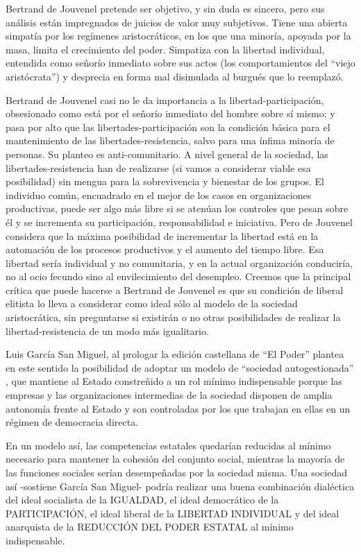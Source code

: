 \documentclass[
]{book}
\begin{document}
Bertrand de Jouvenel pretende ser objetivo, y sin duda es sincero, pero sus análisis están impregnados de juicios de valor muy subjetivos. Tiene una abierta simpatía por los regímenes aristocráticos, en los que una minoría, apoyada por la masa, limita el crecimiento del poder. Simpatiza con la libertad individual, entendida como señorío inmediato sobre sus actos (los comportamientos del ``viejo aristócrata'') y desprecia en forma mal disimulada al burgués que lo reemplazó.

Bertrand de Jouvenel casi no le da importancia a la libertad-participación, obsesionado como está por el señorío inmediato del hombre sobre sí mismo; y pasa por alto que las libertades-participación son la condición básica para el mantenimiento de las libertades-resistencia, salvo para una ínfima minoría de personas. Su planteo es anti-comunitario. A nivel general de la sociedad, las libertades-resistencia han de realizarse (si vamos a considerar viable esa posibilidad) sin mengua para la sobrevivencia y bienestar de los grupos. El individuo común, encuadrado en el mejor de los casos en organizaciones productivas, puede ser algo más libre si se atenúan los controles que pesan sobre él y se incrementa su participación, responsabilidad e iniciativa. Pero de Jouvenel considera que la máxima posibilidad de incrementar la libertad está en la automación de los procesos productivos y el aumento del tiempo libre. Esa libertad sería individual y no comunitaria, y en la actual organización conduciría, no al ocio fecundo sino al envilecimiento del desempleo. Creemos que la principal crítica que puede hacerse a Bertrand de Jouvenel es que su condición de liberal elitista lo lleva a considerar como ideal sólo al modelo de la sociedad aristocrática, sin preguntarse si existirán o no otras posibilidades de realizar la libertad-resistencia de un modo más igualitario.

Luis García San Miguel, al prologar la edición castellana de ``El Poder'' plantea en este sentido la posibilidad de adoptar un modelo de ``sociedad autogestionada'' , que mantiene al Estado constreñido a un rol mínimo indispensable porque las empresas y las organizaciones intermedias de la sociedad disponen de amplia autonomía frente al Estado y son controladas por los que trabajan en ellas en un régimen de democracia directa.

En un modelo así, las competencias estatales quedarían reducidas al mínimo necesario para mantener la cohesión del conjunto social, mientras la mayoría de las funciones sociales serían desempeñadas por la sociedad misma. Una sociedad así -sostiene García San Miguel- podría realizar una buena combinación dialéctica del ideal socialista de la IGUALDAD, el ideal democrático de la PARTICIPACIÓN, el ideal liberal de la LIBERTAD INDIVIDUAL y del ideal anarquista de la REDUCCIÓN DEL PODER ESTATAL al mínimo indispensable.
\end{document}
